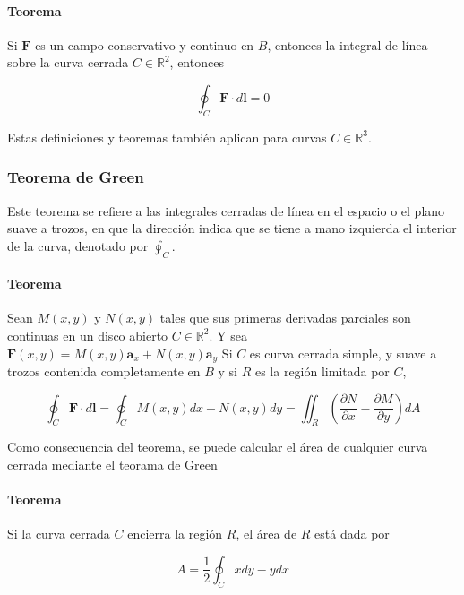 \paragraph*{Teorema} Si $\mathbf{F}$ es un campo conservativo y continuo en $B$, entonces la integral de línea sobre la curva cerrada $C \in \mathbb{R}^2$, entonces

\begin{equation*}
\oint_C \mathbf{F} \cdot d \mathbf{l} = 0
\end{equation*}

Estas definiciones y teoremas también aplican para curvas $C \in \mathbb{R}^3$.

\subsubsection{Teorema de Green}

Este teorema se refiere a las integrales cerradas de línea en el espacio o el plano suave a trozos, en que la dirección indica que se tiene a mano izquierda el interior de la curva, denotado por $\oint_C$.

\paragraph*{Teorema} Sean $M(x,y)$ y $N(x,y)$ tales que sus primeras derivadas parciales son continuas en un disco abierto $C \in \mathbb{R}^2$. Y sea $\mathbf{F}(x,y) = M(x,y) \mathbf{a}_x+ N(x,y) \mathbf{a}_y$ Si $C$ es curva cerrada simple, y suave a trozos contenida completamente en $B$ y si $R$ es la región limitada por $C$,

\begin{equation*}
\oint_C \mathbf{F} \cdot d \mathbf{l}  = \oint_C M(x,y) dx + N(x,y) dy = \iint_R \left(  \frac{\partial N}{\partial x} - \frac{\partial M}{\partial y} \right) dA
\end{equation*}

Como consecuencia del teorema, se puede calcular el área de cualquier curva cerrada mediante el teorama de Green

\paragraph*{Teorema} Si la curva cerrada $C$ encierra la región $R$, el área de $R$ está dada por 

\begin{equation*}
A = \frac{1}{2} \oint_C x dy - y dx
\end{equation*}

